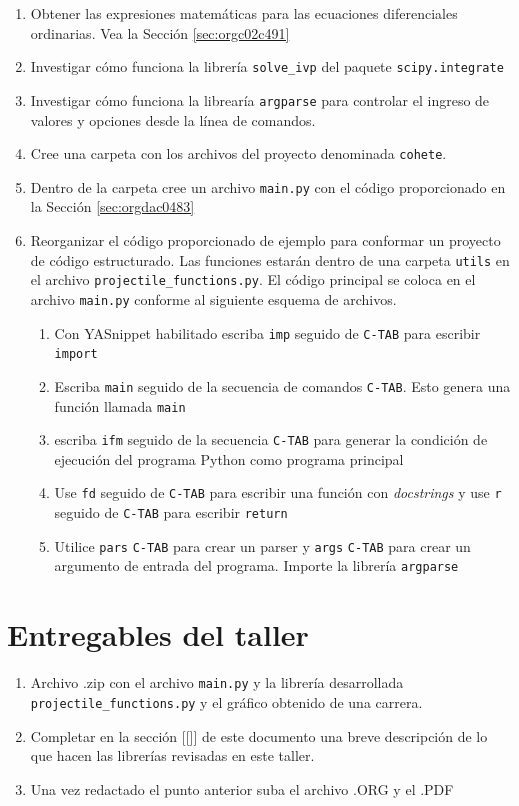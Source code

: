 \documentclass{article}
\begin{document}
\begin{enumerate}
\item Obtener las expresiones matemáticas para las ecuaciones
diferenciales ordinarias. Vea la Sección \ref{sec:orgc02c491}
\item Investigar cómo funciona la librería \texttt{solve\_ivp} del paquete
\texttt{scipy.integrate}
\item Investigar cómo funciona la librearía \texttt{argparse} para controlar el
ingreso de valores y opciones desde la línea de comandos.
\item Cree una carpeta con los archivos del proyecto denominada \texttt{cohete}.
\item Dentro de la carpeta cree un archivo \texttt{main.py} con el código
proporcionado en la Sección \ref{sec:orgdac0483}
\item Reorganizar el código proporcionado de ejemplo para conformar un
proyecto de código estructurado. Las funciones estarán dentro de
una carpeta \texttt{utils} en el archivo \texttt{projectile\_functions.py}. El
código principal se coloca en el archivo \texttt{main.py} conforme al
siguiente esquema de archivos.
\begin{enumerate}
\item Con YASnippet habilitado escriba \texttt{imp} seguido de \texttt{C-TAB} para
escribir \texttt{import}
\item Escriba \texttt{main} seguido de la secuencia
de comandos \texttt{C-TAB}. Esto genera una función llamada \texttt{main}
\item escriba \texttt{ifm} seguido de la secuencia \texttt{C-TAB} para generar la
condición de ejecución del programa Python como programa
principal
\item Use \texttt{fd} seguido de \texttt{C-TAB} para escribir una función con
\emph{docstrings} y use \texttt{r} seguido de \texttt{C-TAB} para escribir \texttt{return}
\item Utilice \texttt{pars} \texttt{C-TAB} para crear un parser y \texttt{args} \texttt{C-TAB}
para crear un argumento de entrada del programa. Importe la
librería \texttt{argparse}
\end{enumerate}
\end{enumerate}

\section{Entregables del taller}
\label{sec:org833aa01}
\begin{enumerate}
\item Archivo .zip con el archivo \texttt{main.py} y la librería desarrollada
\texttt{projectile\_functions.py} y el gráfico obtenido de una carrera.
\item Completar en la sección [[]] de este documento una breve
descripción de lo que hacen las librerías revisadas en este taller.
\item Una vez redactado el punto anterior suba el archivo .ORG y el .PDF
\end{enumerate}
\end{document}
